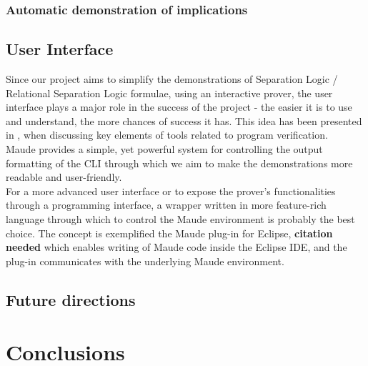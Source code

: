 \documentclass[12pt,a4paper]{article}
\begin{document}
\subsubsection{Automatic demonstration of implications}
\subsection{User Interface}
Since our project aims to simplify the demonstrations of Separation Logic / Relational Separation Logic formulae, using an interactive prover, the user interface plays a major role in the success of the project - the easier it is to use and understand, the more chances of success it has. This idea has been presented in \cite{primer}, when discussing key elements of tools related to program verification. \\

Maude provides a simple, yet powerful system for controlling the output formatting of the CLI through which we aim to make the demonstrations more readable and user-friendly. \\

For a more advanced user interface or to expose the prover's functionalities through a programming interface, a wrapper written in more feature-rich language through which to control the Maude environment is probably the best choice. The concept is exemplified the Maude plug-in for Eclipse, \textbf{citation needed} which enables writing of Maude code inside the Eclipse IDE, and the plug-in communicates with the underlying Maude environment.
\subsection{Future directions}

\section{Conclusions}

\pagebreak


\end{document}
